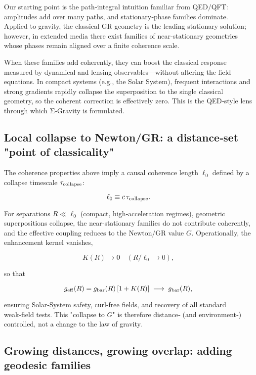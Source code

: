 \documentclass[11pt,a4paper]{article}
\begin{document}
Our starting point is the path‑integral intuition familiar from QED/QFT: amplitudes add over many paths, and stationary‑phase families dominate. Applied to gravity, the classical GR geometry is the leading stationary solution; however, in extended media there exist families of near‑stationary geometries whose phases remain aligned over a finite coherence scale. 


When these families add coherently, they can boost the classical response measured by dynamical and lensing observables—without altering the field equations. In compact systems (e.g., the Solar System), frequent interactions and strong gradients rapidly collapse the superposition to the single classical geometry, so the coherent correction is effectively zero. This is the QED‑style lens through which Σ‑Gravity is formulated.


\subsection{Local collapse to Newton/GR: a distance‑set "point of classicality"}


The coherence properties above imply a causal coherence length $\ell_0$ defined by a collapse timescale $\tau_{\rm collapse}$:


\begin{equation}
\ell_0 \equiv c\,\tau_{\rm collapse}.
\end{equation}


For separations $R\ll\ell_0$ (compact, high‑acceleration regimes), geometric superpositions collapse, the near‑stationary families do not contribute coherently, and the effective coupling reduces to the Newton/GR value $G$. Operationally, the enhancement kernel vanishes,


\begin{equation}
K(R) \to 0 \quad (R/\ell_0 \to 0),
\end{equation}


so that


\begin{equation}
g_{\rm eff}(R) = g_{\rm bar}(R)\,[1 + K(R)] \;\longrightarrow\; g_{\rm bar}(R),
\end{equation}


ensuring Solar‑System safety, curl‑free fields, and recovery of all standard weak‑field tests. This "collapse to $G$" is therefore distance‑ (and environment‑) controlled, not a change to the law of gravity.


\subsection{Growing distances, growing overlap: adding geodesic families}
\end{document}
